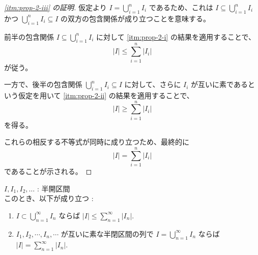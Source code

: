 \documentclass[article,paper=a4paper]{jlreq}
\begin{document}
\begin{proof}[\ref{itm:prop-2-iii} の証明]
仮定より $I = \bigcup_{i=1}^{n} I_i$ であるため、これは $I \subseteq \bigcup_{i=1}^{n} I_i$ かつ $\bigcup_{i=1}^{n} I_i \subseteq I$ の双方の包含関係が成り立つことを意味する。

前半の包含関係 $I \subseteq \bigcup_{i=1}^{n} I_i$ に対して \ref{itm:prop-2-i} の結果を適用することで、
\[
 |I| \leq \sum_{i=1}^{n} |I_i|
\]
が従う。

一方で、後半の包含関係 $\bigcup_{i=1}^{n} I_i \subseteq I$ に対して、さらに $I_i$ が互いに素であるという仮定を用いて \ref{itm:prop-2-ii} の結果を適用することで、
\[
 |I| \geq \sum_{i=1}^{n} |I_i|
\]
を得る。

これらの相反する不等式が同時に成り立つため、最終的に
\[
 |I| = \sum_{i=1}^{n} |I_i|
\]
であることが示される。
\end{proof}


\begin{prop}\label{prop:prop-3}
    \quad $I, I_1, I_2, \ldots$ : 半開区間\\
    このとき、以下が成り立つ :
    \begin{enumerate}[label=(\roman*)\,,ref=(\roman*)]
        \item \label{itm:prop-3-i} $I\subset \bigcup_{n=1}^{\infty}I_n$ ならば $|I|\leq \sum_{n=1}^{\infty}|I_n|$.
        \item \label{itm:prop-3-ii} $I_1,I_2,\cdots,I_n,\cdots$ が互いに素な半閉区間の列で $I=\bigcup_{n=1}^{\infty}I_n$ ならば $|I|=\sum_{n=1}^{\infty}|I_n|$.
    \end{enumerate}
\end{prop}
\end{document}
